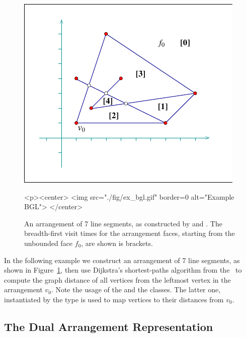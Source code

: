\begin{figure}[!htp]
\begin{ccTexOnly}
  \begin{center}
  \includegraphics{Arrangement_2/fig/ex_bgl}
  \end{center}
\end{ccTexOnly}
\begin{ccHtmlOnly}
  <p><center>
  <img src="./fig/ex_bgl.gif" border=0 alt="Example BGL">
  </center>
\end{ccHtmlOnly}
\caption{An arrangement of 7 line segments, as constructed by
 and .
The breadth-first visit times for the arrangement faces, starting
from the unbounded face $f_0$, are shown is brackets.}
\label{arr_fig:ex_bgl}
\end{figure}

In the following example we construct an arrangement of 7 line segments,
as shown in Figure~\ref{arr_fig:ex_bgl},
then use Dijkstra's shortest-paths algorithm from the \bgl\ to compute
the graph distance of all vertices from the leftmost vertex in the
arrangement $v_0$. Note the usage of the  and
the  classes. The latter one, instantiated by
the type  is used to map vertices to their distances from $v_0$.


\subsection{The Dual Arrangement Representation}
\label{arr_ssec:bgl_dual}

